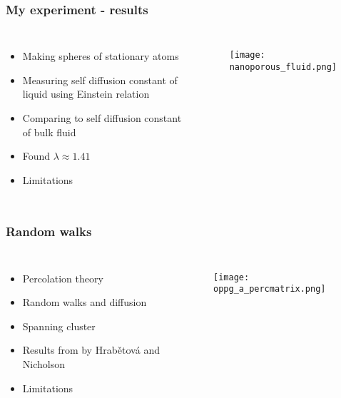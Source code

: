 \documentclass{beamer}
\begin{document}
\begin{frame}
 \frametitle{My experiment - results}
 \begin{columns}
  \column{2.0in}
  \begin{itemize}
   \item Making spheres of stationary atoms
   \item Measuring self diffusion constant of liquid using Einstein relation
   \item Comparing to self diffusion constant of bulk fluid
   \item Found $\lambda \approx 1.41$
   \item Limitations
  \end{itemize}
\column{2.0in}
\begin{figure}[H]
\centering
\texttt{[image: nanoporous\_fluid.png]}
 \end{figure}

 \end{columns}

\end{frame}

\begin{frame}
 \frametitle{Random walks}
 \begin{columns}
  \column{2.0in}
  \begin{itemize}
   \item Percolation theory
   \item Random walks and diffusion
   \item Spanning cluster
   \item Results from by Hrab\v{e}tov\'{a} and Nicholson
   \item Limitations
  \end{itemize}
\column{2.0in}
\begin{figure}[H]
\centering
\texttt{[image: oppg\_a\_percmatrix.png]}
 \end{figure}

 \end{columns}
\end{frame}
\end{document}
